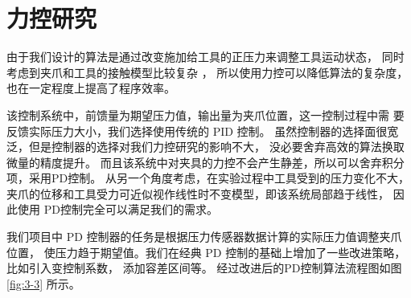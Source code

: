 


\section{力控研究}
由于我们设计的算法是通过改变施加给工具的正压力来调整工具运动状态，
同时考虑到夹爪和工具的接触模型比较复杂 \cite{ref11} ，
所以使用力控可以降低算法的复杂度，也在一定程度上提高了程序效率。

该控制系统中，前馈量为期望压力值，输出量为夹爪位置，这一控制过程中需
要反馈实际压力大小，我们选择使用传统的 PID 控制。
虽然控制器的选择面很宽泛，但是控制器的选择对我们力控研究的影响不大，
没必要舍弃高效的算法换取微量的精度提升。
而且该系统中对夹具的力控不会产生静差，所以可以舍弃积分项，采用PD控制。
从另一个角度考虑，在实验过程中工具受到的压力变化不大，
夹爪的位移和工具受力可近似视作线性时不变模型，即该系统局部趋于线性，
因此使用 PD控制完全可以满足我们的需求。

我们项目中 PD 控制器的任务是根据压力传感器数据计算的实际压力值调整夹爪位置，
使压力趋于期望值。我们在经典 PD 控制的基础上增加了一些改进策略，
比如引入变控制系数， 添加容差区间等。
经过改进后的PD控制算法流程图如图 \ref{fig:3-3} 所示。

